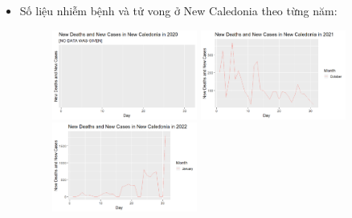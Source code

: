 \documentclass[a4paper]{article}
\theoremstyle{definition}
\begin{document}
\begin{enumerate}[i)]
\begin{enumerate}[1]
     \begin{itemize}
    \item{Số liệu nhiễm bệnh và tử vong ở New Caledonia theo từng năm:}\\ 
     \begin{figure}[htp!]
    \includegraphics[width=0.45\textwidth]{Images/3.4v.png}
    \includegraphics[width=0.45\textwidth]{Images/3.5v.png}
    \includegraphics[width=0.45\textwidth]{Images/3.6v.png}
  \end{figure}
    \end{itemize}
    \vspace{5cm}
    

\end{enumerate}
\end{enumerate}
\end{document}
